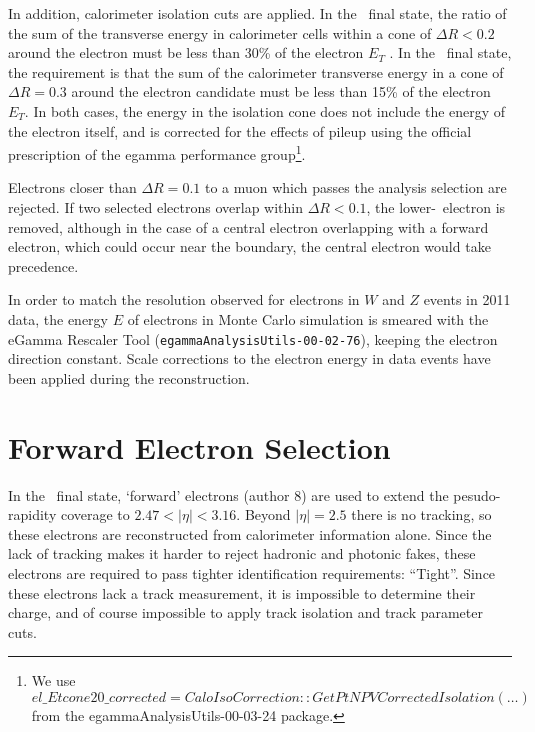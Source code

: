 In addition, calorimeter isolation cuts are applied. In the \llll\ final state, the ratio of the sum of the transverse energy in calorimeter cells 
within a cone of $\Delta R < 0.2$ around the electron 
 must be less than 30\% of the electron $E_T$ .
In the \llvv\ final state, the requirement is that the sum of the calorimeter transverse energy in
a cone of $\Delta R = 0.3$ around the electron candidate must be less than
15\% of the electron $E_{T}$.
In both cases, the energy in the isolation cone does not include the energy of
the electron itself, and is corrected for the
effects of pileup using the official prescription of the 
egamma performance group\footnote{We use $el\_Etcone20\_corrected = CaloIsoCorrection::GetPtNPVCorrectedIsolation(\ldots)$ from the egammaAnalysisUtils-00-03-24 package.}.

Electrons closer than $\Delta R=0.1$ to a muon which passes the analysis selection 
are rejected. If two selected electrons overlap within $\Delta R < 0.1$, the
lower-\pt\ electron is removed, although in the case of a central electron
overlapping with a forward electron, which could occur near the boundary, the
central electron would take precedence.

In order to match the resolution observed for electrons in $W$ and $Z$
events in 2011 data, the energy $E$ of electrons in
Monte Carlo simulation is smeared with the eGamma Rescaler
Tool (\texttt{egammaAnalysisUtils-00-02-76}), keeping the electron direction 
constant. Scale corrections to
the electron energy in data events have been applied during the reconstruction.

\section{Forward Electron Selection}

In the \llll\ final state, `forward' electrons (author 8) are used
to extend the pesudo-rapidity coverage to $2.47<|\eta|<3.16$. Beyond $|\eta|=2.5$
there is no tracking, so these electrons are reconstructed from calorimeter
information alone. Since the lack of tracking makes it harder to reject hadronic
and photonic fakes, these electrons are required to pass tighter
identification requirements: ``Tight''. Since these electrons lack a track
measurement, it is impossible to determine their charge, and of course
impossible to apply track isolation and track parameter cuts. 

